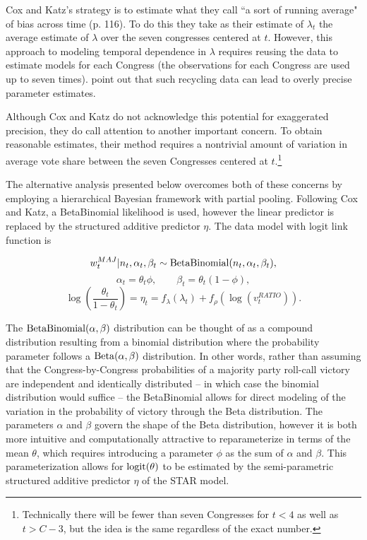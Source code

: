 Cox and Katz's strategy is to estimate what they call ``a sort of running average" of bias across time (p. 116). To do this they take as their estimate of $\lambda_t$ the average estimate of $\lambda$ over the seven congresses centered at $t$. However, this approach to modeling temporal dependence in $\lambda$ requires reusing the data to estimate models for each Congress (the observations for each Congress are used up to seven times).   point out that such recycling data can lead to overly precise parameter estimates. 

Although Cox and Katz do not acknowledge this potential for exaggerated precision, they do call attention to another important concern. To obtain reasonable estimates, their method requires a nontrivial amount of variation in average vote share between the seven Congresses centered at $t$.\footnote{Technically there will be fewer than seven Congresses for $t < 4$ as well as $t > C- 3$, but the idea is the same regardless of the exact number.}


The alternative analysis presented below overcomes both of these concerns by employing a hierarchical Bayesian framework with partial pooling. Following Cox and Katz, a BetaBinomial likelihood is used, however the linear predictor is replaced by the structured additive predictor $\eta$. The data model with logit link function is 

$$w_t^{MAJ} | n_t, \alpha_t, \beta_t \sim {\rm BetaBinomial}(n_t, \alpha_t, \beta_t),$$
$$ \alpha_t = \theta_t \phi, \qquad \beta_t = \theta_t (1 - \phi),$$
$$ \log\left({\frac{\theta_t}{1 - \theta_t}}\right) = \eta_t = f_{\lambda}(\lambda_t) + f_\rho \left(\log{(v_t^{RATIO})}\right).$$

The ${\rm BetaBinomial}(\alpha,\beta)$ distribution can be thought of as a compound distribution resulting from a binomial distribution where the probability parameter follows a ${\rm Beta}(\alpha,\beta)$ distribution. In other words, rather than assuming that the Congress-by-Congress probabilities of a majority party roll-call victory are independent and identically distributed -- in which case the binomial distribution would suffice -- the BetaBinomial  allows for direct modeling of the variation in the probability of victory through the Beta distribution. The parameters $\alpha$ and $\beta$ govern the shape of the Beta distribution, however it is both more intuitive and computationally attractive to reparameterize in terms of the mean $\theta$, which requires introducing a parameter $\phi$ as the sum of $\alpha$ and $\beta$.  This parameterization allows for ${\rm logit}(\theta)$ to be estimated by the semi-parametric structured additive predictor $\eta$ of the STAR model. 

